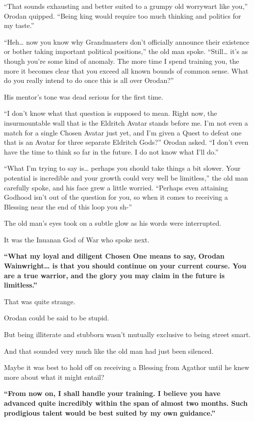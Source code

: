 \documentclass[a4paper,10pt]{book}
\begin{document}
“That sounds exhausting and better suited to a grumpy old worrywart like you,” Orodan quipped. “Being king would require too much thinking and politics for my taste.”\par
“Heh… now you know why Grandmasters don’t officially announce their existence or bother taking important political positions,” the old man spoke. “Still… it’s as though you’re some kind of anomaly. The more time I spend training you, the more it becomes clear that you exceed all known bounds of common sense. What do you really intend to do once this is all over Orodan?”\par
His mentor’s tone was dead serious for the first time.\par
“I don’t know what that question is supposed to mean. Right now, the insurmountable wall that is the Eldritch Avatar stands before me. I’m not even a match for a single Chosen Avatar just yet, and I’m given a Quest to defeat one that is an Avatar for three separate Eldritch Gods?” Orodan asked. “I don’t even have the time to think so far in the future. I do not know what I’ll do.”\par
“What I’m trying to say is… perhaps you should take things a bit slower. Your potential is incredible and your growth could very well be limitless,” the old man carefully spoke, and his face grew a little worried. “Perhaps even attaining Godhood isn’t out of the question for you, so when it comes to receiving a Blessing near the end of this loop you sh-”\par
The old man’s eyes took on a subtle glow as his words were interrupted.\par
It was the Inuanan God of War who spoke next.\par
\textbf{“What my loyal and diligent Chosen One means to say, Orodan Wainwright… is that you should continue on your current course. You are a true warrior, and the glory you may claim in the future is limitless.”}\par
That was quite strange.\par
Orodan could be said to be stupid.\par
But being illiterate and stubborn wasn’t mutually exclusive to being street smart.\par
And that sounded very much like the old man had just been silenced.\par
Maybe it was best to hold off on receiving a Blessing from Agathor until he knew more about what it might entail?\par
\textbf{“From now on, I shall handle your training. I believe you have advanced quite incredibly within the span of almost two months. Such prodigious talent would be best suited by my own guidance.”}\par
\end{document}
